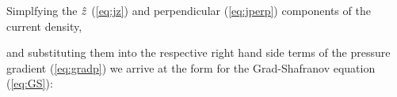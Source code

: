 \noindent Simplfying the $\hat{z}$ (\ref{eq:jz}) and perpendicular (\ref{eq:jperp}) components of the current density,

\noindent and substituting them into the respective right hand side terms of the pressure gradient (\ref{eq:gradp}) we arrive at the form for the Grad-Shafranov equation (\ref{eq:GS}):


